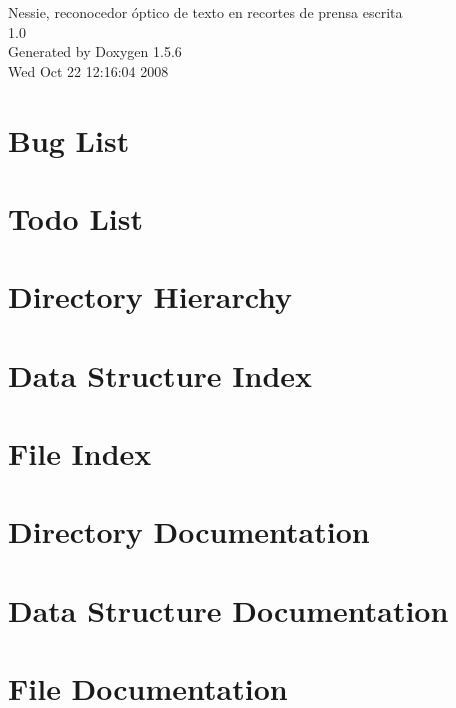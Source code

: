 \documentclass[a4paper]{book}
\begin{document}
\begin{titlepage}
\vspace*{7cm}
\begin{center}
{\Large Nessie, reconocedor óptico de texto en recortes de prensa escrita \\[1ex]\large 1.0 }\\
\vspace*{1cm}
{\large Generated by Doxygen 1.5.6}\\
\vspace*{0.5cm}
{\small Wed Oct 22 12:16:04 2008}\\
\end{center}
\end{titlepage}
\clearemptydoublepage
{}
\tableofcontents
\clearemptydoublepage
{}
\chapter{Bug List}
\label{bug}
\hypertarget{bug}{}

\chapter{Todo List}
\label{todo}
\hypertarget{todo}{}

\chapter{Directory Hierarchy}

\chapter{Data Structure Index}

\chapter{File Index}

\chapter{Directory Documentation}


\chapter{Data Structure Documentation}









\chapter{File Documentation}





















\printindex
\end{document}
